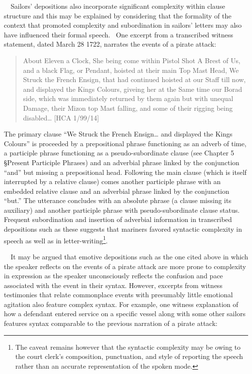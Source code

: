 \begin{styleStandard}
\ \ Sailors’ depositions also incorporate significant complexity within clause structure and this may be explained by considering that the formality of the context that promoted complexity and subordination in sailors’ letters may also have influenced their formal speech. \ One excerpt from a transcribed witness statement, dated March 28 1722, narrates the events of a pirate attack:
\end{styleStandard}


\begin{quotation}
About Eleven a Clock, She being come within Pistol Shot A Brest of Us, and a black Flag, or Pendant, hoisted at their main Top Mast Head, We Struck the French Ensign, that had continued hoisted at our Staff till now, and displayed the Kings Colours, giveing her at the Same time our Borad side, which was immediately returned by them again but with unequal Damage, their Mizon top Mast falling, and some of their rigging being disabled… [HCA 1/99/14] 

\end{quotation}
\begin{styleStandard}
The primary clause “We Struck the French Ensign… and displayed the Kings Colours” is proceeded by a prepositional phrase functioning as an adverb of time, a participle phrase functioning as a pseudo-subordinate clause (see Chapter 5 §Present Participle Phrases) and an adverbial phrase linked by the conjunction “and” but missing a prepositional head. Following the main clause (which is itself interrupted by a relative clause) comes another participle phrase with an embedded relative clause and an adverbial phrase linked by the conjunction “but.” The utterance concludes with an absolute phrase (a clause missing its auxiliary) and another participle phrase with pseudo-subordinate clause status. Frequent subordination and insertion of adverbial information in transcribed depositions such as these suggests that mariners favored syntactic complexity in speech as well as in letter-writing\footnote{ The caveat remains however that the syntactic complexity may be owing to the court clerk’s composition, punctuation, and style of reporting the speech rather than an accurate representation of the spoken mode. }. 
\end{styleStandard}


\begin{styleStandard}
\ \ It may be argued that emotive depositions such as the one cited above in which the speaker reflects on the events of a pirate attack are more prone to complexity in expression as the speaker unconsciously reflects the confusion and pace associated with the event in their syntax. However, excerpts from witness testimonies that relate commonplace events with presumably little emotional agitation also feature complex syntax. For example, one witness explanation of how a defendant entered service on a specific vessel along with some other sailors features syntax comparable to the previous narration of a pirate attack:
\end{styleStandard}



